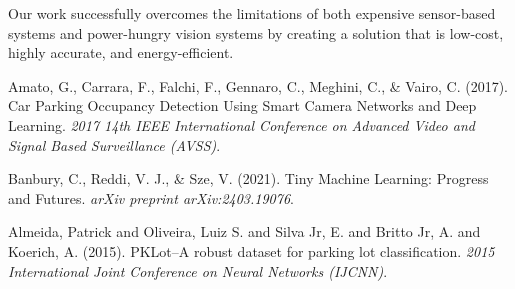 \documentclass[sigconf,10pt,nonacm]{acmart}
\begin{document}
Our work successfully overcomes the limitations of both expensive sensor-based systems and power-hungry vision systems by creating a solution that is low-cost, highly accurate, and energy-efficient.

\begin{thebibliography}{9}

Amato, G., Carrara, F., Falchi, F., Gennaro, C., Meghini, C., \& Vairo, C. (2017).
Car Parking Occupancy Detection Using Smart Camera Networks and Deep Learning.
\textit{2017 14th IEEE International Conference on Advanced Video and Signal Based Surveillance (AVSS)}.

Banbury, C., Reddi, V. J., \& Sze, V. (2021).
Tiny Machine Learning: Progress and Futures.
\textit{arXiv preprint arXiv:2403.19076}.

Almeida, Patrick and Oliveira, Luiz S. and Silva Jr, E. and Britto Jr, A. and Koerich, A. (2015).
PKLot--A robust dataset for parking lot classification.
\textit{2015 International Joint Conference on Neural Networks (IJCNN)}.

\end{thebibliography}
\end{document}
